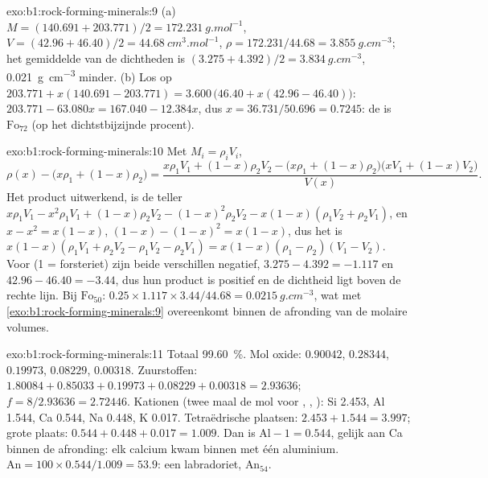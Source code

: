 \begin{solution}{exo:b1:rock-forming-minerals:9}
(a) $M = (140.691 + 203.771)/2 = \qty{172.231}{g.mol^{-1}}$, $V = (42.96 +
46.40)/2 = \qty{44.68}{cm^3.mol^{-1}}$, $\rho = 172.231/44.68 =
\qty{3.855}{g.cm^{-3}}$; het gemiddelde van de dichtheden is $(3.275 + 4.392)/2 =
\qty{3.834}{g.cm^{-3}}$, \qty{0.021}{g.cm^{-3}} minder. (b) Los op
$203.771 + x(140.691 - 203.771) = 3.600\,\bigl(46.40 + x(42.96 - 46.40)\bigr)$:
$203.771 - 63.080x = 167.040 - 12.384x$, dus $x = 36.731/50.696 = 0.7245$: de
 is $\text{Fo}_{72}$ (op het dichtstbijzijnde procent).
\end{solution}

\begin{solution}{exo:b1:rock-forming-minerals:10}
Met $M_i = \rho_i V_i$,
\[
  \rho(x) - \bigl(x\rho_1 + (1 - x)\rho_2\bigr)
  = \frac{x\rho_1V_1 + (1 - x)\rho_2V_2 - \bigl(x\rho_1 + (1 - x)\rho_2\bigr)\bigl(xV_1 + (1 - x)V_2\bigr)}{V(x)} .
\]
Het product uitwerkend, is de teller $x\rho_1V_1 - x^2\rho_1V_1 +
(1 - x)\rho_2V_2 - (1 - x)^2\rho_2V_2 - x(1 - x)(\rho_1V_2 + \rho_2V_1)$, en
$x - x^2 = x(1 - x)$, $(1 - x) - (1 - x)^2 = x(1 - x)$, dus het is
$x(1 - x)(\rho_1V_1 + \rho_2V_2 - \rho_1V_2 - \rho_2V_1) =
x(1 - x)(\rho_1 - \rho_2)(V_1 - V_2)$. Voor  (1 = forsteriet) zijn beide verschillen negatief,
$3.275 - 4.392 = -1.117$ en $42.96 - 46.40 =
-3.44$, dus hun product is positief en de dichtheid ligt boven de rechte lijn. Bij $\text{Fo}_{50}$:
$0.25\times1.117\times3.44/44.68 =
\qty{0.0215}{g.cm^{-3}}$, wat met \cref{exo:b1:rock-forming-minerals:9} overeenkomt binnen de afronding van de
molaire volumes.
\end{solution}

\begin{solution}{exo:b1:rock-forming-minerals:11}
Totaal \qty{99.60}{\percent}. Mol oxide:  $0.90042$,
 $0.28344$,  $0.19973$,  $0.08229$,
 $0.00318$. Zuurstoffen: $1.80084 + 0.85033 + 0.19973 + 0.08229 +
0.00318 = 2.93636$; $f = 8/2.93636 = 2.72446$. Kationen (twee maal de mol voor
, , ): Si \num{2.453}, Al \num{1.544}, Ca
\num{0.544}, Na \num{0.448}, K \num{0.017}. Tetraëdrische plaatsen:
$2.453 + 1.544 = 3.997$; grote plaats: $0.544 + 0.448 + 0.017 = 1.009$. Dan is
$\mathrm{Al} - 1 = 0.544$, gelijk aan Ca binnen de afronding: elk calcium kwam
binnen met één aluminium. $\mathrm{An} = 100\times0.544/1.009 = 53.9$: een
labradoriet, $\text{An}_{54}$.
\end{solution}

